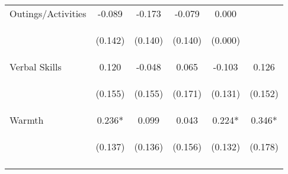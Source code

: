 \begin{tabular}{lccccc}
\noalign{\smallskip}Outings/Activities & -0.089 & -0.173 & -0.079 & 0.000 & \\
 & \begin{footnotesize}(0.142)\end{footnotesize} & \begin{footnotesize}(0.140)\end{footnotesize} & \begin{footnotesize}(0.140)\end{footnotesize} & \begin{footnotesize}(0.000)\end{footnotesize} & \begin{footnotesize}\end{footnotesize}\\
\noalign{\smallskip}Verbal Skills & 0.120 & -0.048 & 0.065 & -0.103 & 0.126\\
 & \begin{footnotesize}(0.155)\end{footnotesize} & \begin{footnotesize}(0.155)\end{footnotesize} & \begin{footnotesize}(0.171)\end{footnotesize} & \begin{footnotesize}(0.131)\end{footnotesize} & \begin{footnotesize}(0.152)\end{footnotesize}\\
\noalign{\smallskip}Warmth & 0.236* & 0.099 & 0.043 & 0.224* & 0.346*\\
 & \begin{footnotesize}(0.137)\end{footnotesize} & \begin{footnotesize}(0.136)\end{footnotesize} & \begin{footnotesize}(0.156)\end{footnotesize} & \begin{footnotesize}(0.132)\end{footnotesize} & \begin{footnotesize}(0.178)\end{footnotesize}\\
\noalign{\smallskip}\hline\end{tabular}\\
